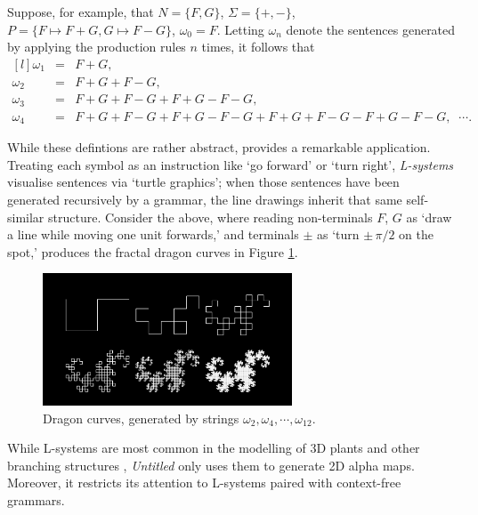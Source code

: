 \documentclass[a4paper, 11pt]{article}
\begin{document}
\begin{flushleft}
\vspace{5pt}\noindent
Suppose, for example, that $N = \{F, G\}$, $\Sigma = \{+, -\}$, $P = \{F \mapsto F+G, G \mapsto F-G\}$, $\omega_0 = F$.
Letting $\omega_n$ denote the sentences generated by applying the production rules $n$ times, it follows that
$$\begin{matrix*}[l]
\omega_1 &= &F+G, \\
\omega_2 &= &F+G+F-G, \\
\omega_3 &= &F+G+F-G+F+G-F-G, \\
\omega_4 &= &F+G+F-G+F+G-F-G+F+G+F-G-F+G-F-G, \;\; \cdots.
\end{matrix*}$$

\vspace{5pt}\noindent
While these defintions are rather abstract, \citet{lindenmayerLSystems} provides a remarkable application. Treating each symbol as an instruction like `go forward' or `turn right', \textit{L-systems} visualise sentences via `turtle graphics'; when those sentences have been generated recursively by a grammar, the line drawings inherit that same self-similar structure. Consider the above, where reading non-terminals $F$, $G$ as `draw a line while moving one unit forwards,' and terminals $\pm$ as `turn $\pm\, \pi/2$ on the spot,' produces the fractal dragon curves in Figure \ref{Dragon Curves}.

\vspace{5pt}\noindent
\begin{figure}[h]
\centering
\includegraphics[width=0.66\textwidth]{Dragon Curves}
\caption{Dragon curves, generated by strings $\omega_2, \omega_4, \cdots, \omega_{12}$.}
\label{Dragon Curves}
\end{figure}

\vspace{5pt}\noindent
While L-systems are most common in the modelling of 3D plants and other branching structures \citep{prusinkiewiczAlgorithmicBeauty}, \textit{Untitled} only uses them to generate 2D alpha maps. Moreover, it restricts its attention to L-systems paired with context-free grammars.


\end{flushleft}
\end{document}
